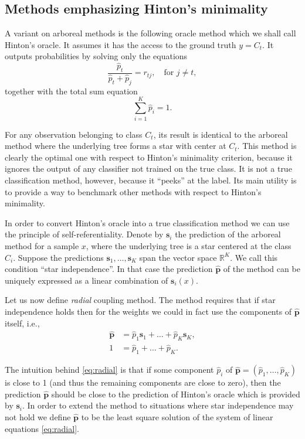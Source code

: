 \subsection{Methods emphasizing Hinton's minimality}

A variant on arboreal methods is the following oracle method which we shall call Hinton's oracle. It  assumes it has the access to the ground truth $y = C_t$. It outputs probabilities by solving only the equations
$$
\frac{\hat p_t}{\hat p_t + \hat p_j} = {r}_{tj},\quad \textrm{for }j\not = t,
$$
together   with the total sum equation
$$
\sum_{i=1}^K  \hat p_i = 1.
$$

For any observation belonging to class $C_t$, its result is identical to the arboreal method where the underlying tree forms a star with center at $C_t$. This method is clearly the optimal one with respect to Hinton's minimality criterion, because it ignores the output of any classifier not trained on the true class. It is not a true classification method, however, because it ``peeks'' at the label. Its main utility is to provide a way to benchmark other methods with respect to Hinton's minimality.

In order to convert Hinton's oracle into a true classification method we can use the principle of self-referentiality.  
Denote by $\boldsymbol{s}_i$ the prediction of the arboreal method for a sample $x$, where the underlying tree is a star centered at the class $C_i$. 
Suppose the predictions $\boldsymbol{s}_1, \ldots, \boldsymbol{s}_K$ span the vector space $\mathbb{R}^K$. We call this condition ``star independence''.  In that case the prediction $\hat{\boldsymbol{p}}$ of the method  can be uniquely expressed as a linear combination of $\boldsymbol{s}_i(x)$. 

Let us now define \emph{radial} coupling method. The  method requires that if star independence holds then for the  weights we could in fact use the components of $\hat{\boldsymbol{p}}$ itself, i.e.,
\begin{equation}
	\begin{split}
	\hat {\boldsymbol{p}} &= \hat p_1 \boldsymbol{s}_1 + \ldots + \hat p_K \boldsymbol{s}_K,\\
	1 &= \hat p_1 + \ldots + \hat p_K.
	\end{split}
	 \label{eq:radial}
\end{equation}

The intuition behind \eqref{eq:radial} is that if some component $\hat p_i$ of $\hat{\boldsymbol{p}} =(\hat p_1, \ldots, \hat p_K) $ is close to 1 (and thus the remaining components are close to zero), then the prediction $\hat{\boldsymbol{p}}$ should be close to the prediction of Hinton's oracle which is provided by ${\boldsymbol{s}}_i$. 
In order to extend the method to situations where star independence may not hold we define $\hat{\boldsymbol{p}}$ 
to be the least square solution of the  system of linear equations \ref{eq:radial}.

